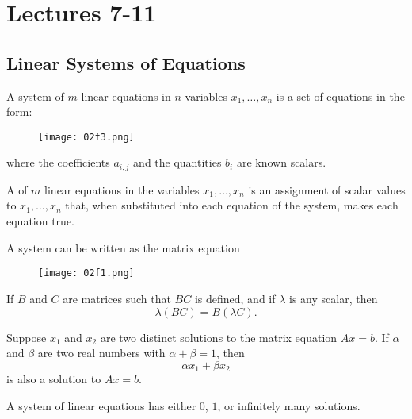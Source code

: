 \section{Lectures 7-11}

\subsection{Linear Systems of Equations}
\begin{definition}
  A system of $m$ linear equations in $n$ variables $x_{1}, \dots, x_{n}$ is a set of equations in the form:
  \begin{figure}[H]
    \centering
    \texttt{[image: 02f3.png]}
  \end{figure}
  where the coefficients $a_{i, j}$ and the quantities $b_{i}$ are known scalars.
\end{definition}

\begin{definition}
  A  of $m$ linear equations in the variables $x_{1}, \dots, x_{n}$
  is an assignment of scalar values to $x_{1}, \dots, x_{n}$ that, when substituted into each equation of the system,
  makes each equation true.
\end{definition}

A system can be written as the matrix equation
\begin{figure}[H]
  \centering
  \texttt{[image: 02f1.png]}
\end{figure}

\begin{lemma}
  If $B$ and $C$ are matrices such that $BC$ is defined, and if $\lambda$ is any scalar, then 
  \begin{equation*}
    \lambda (BC) = B(\lambda C).
  \end{equation*}
\end{lemma}

\begin{theorem}
  Suppose $x_{1}$ and $x_{2}$ are two distinct solutions to the matrix equation $Ax = b$.
  If $\alpha$ and $\beta$ are two real numbers with $\alpha + \beta = 1$, then 
  \begin{equation*}
    \alpha x_{1} + \beta x_{2}
  \end{equation*}
  is also a solution to $Ax = b$.
\end{theorem}

\begin{corollary}
  A system of linear equations has either $0$, $1$, or infinitely many solutions.
\end{corollary}


